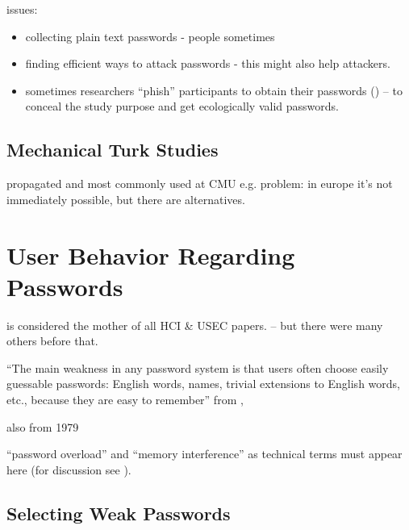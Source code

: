 	issues:
	\begin{itemize}
		\item collecting plain text passwords - people sometimes
		\item finding efficient ways to attack passwords - this might also help attackers. 
		\item sometimes researchers ``phish'' participants to obtain their passwords (\cite{Egelman2013DoesMyPasswordGoUpToEleven, Haque2014Hierarchy, Mazurek2013Measuring}) -- to conceal the study purpose and get ecologically valid passwords. 
	\end{itemize}
	

	\subsection{Mechanical Turk Studies}
	
	propagated and most commonly used at CMU e.g. \cite{Mazurek2013Measuring} \cite{Shay2014CanLongPasswordsBeSecureAndUsable} \cite{Shay2016DesigningPasswordPolicies}
	\cite{Shay2015UsablePoliciesMTurk}
	\cite{Ur2016PerceptionsPassword} \cite{Melicher2016UsabilityMobileTextPasswords} \cite{Ur2017DataDrivenPWMeter}
	problem: in europe it's not immediately possible, but there are alternatives. 



	
\section{User Behavior Regarding Passwords}
\label{sec:rw:how-users-cope}


\cite{Adams1999UsersEnemy} is considered the mother of all HCI \& USEC papers. -- but there were many others before that.

``The main weakness in any password system is that users often choose easily guessable passwords: English words, names, trivial extensions to English words, etc., because they are easy to remember'' from \cite{Feldmeier1990UnixPasswordSecurity},

also \cite{Morris1979PasswordSecurity} from 1979


``password overload'' and ``memory interference'' as technical terms must appear here (for discussion see \cite{Yang2016MnemonicSentenceBased}).

	\subsection{Selecting Weak Passwords}

